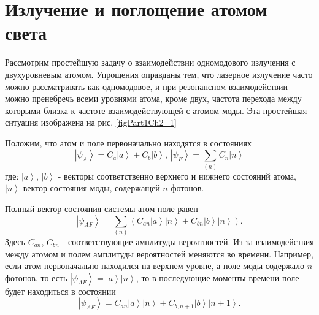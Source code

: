\section{Излучение и поглощение атомом света}
Рассмотрим простейшую задачу о взаимодействии одномодового излучения с
двухуровневым атомом. Упрощения оправданы тем, что лазерное излучение
часто можно рассматривать как одномодовое, и при резонансном
взаимодействии можно пренебречь всеми уровнями атома, кроме двух,
частота перехода между которыми близка к частоте взаимодействующей с
атомом моды. Эта простейшая ситуация изображена на рис. \ref{figPart1Ch2_1}



Положим, что атом и поле первоначально находятся в состояниях
\begin{equation}
\left|\psi_A\right> = C_a\left|a\right> + C_b\left|b\right>, \,
\left|\psi_F\right> = \sum_{(n)}C_n\left|n\right>
\end{equation}
где:  $\left|a\right>$, $\left|b\right>$ - векторы соответственно
верхнего и нижнего состояний атома, $\left|n\right>$ вектор состояния
моды, содержащей  $n$  фотонов.
  
Полный вектор состояния системы атом-поле равен
\begin{equation}
\left|\psi_{AF}\right> = \sum_{(n)} 
\left(
C_{an}\left|a\right>\left|n\right> + 
C_{bn}\left|b\right>\left|n\right>
\right).
\end{equation}
Здесь $C_{an}$, $C_{bn}$ - соответствующие амплитуды
вероятностей. Из-за взаимодействия между атомом и полем
амплитуды вероятностей меняются во времени. Например, если
атом первоначально находился на верхнем уровне, а поле моды
содержало  $n$  фотонов, то есть  
$\left|\psi_{AF}\right> = \left|a\right>\left|n\right>$,
то в последующие моменты времени поле будет находиться в состоянии  
\begin{equation}
\left|\psi_{AF}\right> =
C_{an}\left|a\right>\left|n\right> + 
C_{b,n + 1}\left|b\right>\left|n + 1\right>.
\end{equation}

